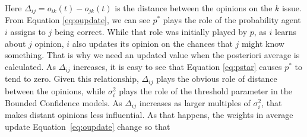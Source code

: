 \documentclass{article}
\begin{document}
Here \(\Delta_{ij} = o_{ik} (t) - o_{jk} (t)\) is the distance between the
opinions on the $k$ issue. From Equation \ref{eq:oupdate}, we can see $p^{*}$ plays the role of the 
probability agent $i$ assigns to $j$ being correct. While that role was initially played by $p$, as $i$ learns
about $j$ opinion, $i$ also updates its opinion on the chances that $j$ might know something. That is why
we need an updated value when the posteriori average is calculated.
As $\Delta_{ij}$ increases, it is easy to see that
Equation \ref{eq:pstar} causes $p^{*}$ to tend to zero. Given this relationship,
$\Delta_{ij}$ plays the obvious role of distance between the opinions, while $\sigma_i^2$ plays the role of the threshold parameter in the Bounded
Confidence models. As $\Delta_{ij}$ increases as larger multiples of $\sigma_i^2$, that makes distant opinions less influential. As that
happens, the weights in average update Equation~\ref{eq:oupdate} change so that
\end{document}
